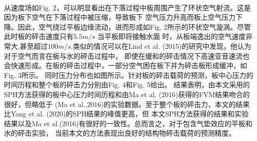 \documentclass[UTF8]{ctexart}
\begin{document}
\paragraph{\quad}从速度场如Fig. 2，可以明显看出在下落过程中板周围产生了环状空气射流。这是因为板下空气在下落过程中被压缩，导致板下
            空气压力升高而板上空气压力下降。因此，空气绕过平板边缘流动，进而形成如Fig. 2所示的环状空气漩涡。尽管此时板的砰击速度只有$5.5m/s$
            当平板即将接触水面
            时，从板端逸出的空气速度非常大,甚至超过$100m/s$.类似的情况可以在Lind et al. (2015)的研究中发现，他认为对于空气而言在板与水的砰击过程中，
            即使在缓和的砰击情况下高速亚音速流也会快速形成。在板的砰击过程中，一部分空气困在板下并为砰击板形成缓冲，如Fig. 3所示。
            同时压力分布也如图所示。针对板的砰击载荷的预测，板中心压力的时间历程和整个板的砰击力分别由Fig. 4和Fig. 5给出。
            结果表明，由本文采用的SPH方法获得的板中心压力时间历程和由Ma et al. (2016)获得的FVM结果吻合的很好，但略低于
            (Ma et al.,2016)的实验数据。至于整个板的砰击力，本文的结果比Yang et al. (2020)的SPH结果的峰值更高，但
            本文SPH方法获得的结果和实验结果以及Ma et al.(2016)有很好的一致性。总而言之，对于包含气垫效应的平板和水的砰击实验，
            当前本文的方法表现出良好的结构物砰击载荷的预测精度。\\
\end{document}
